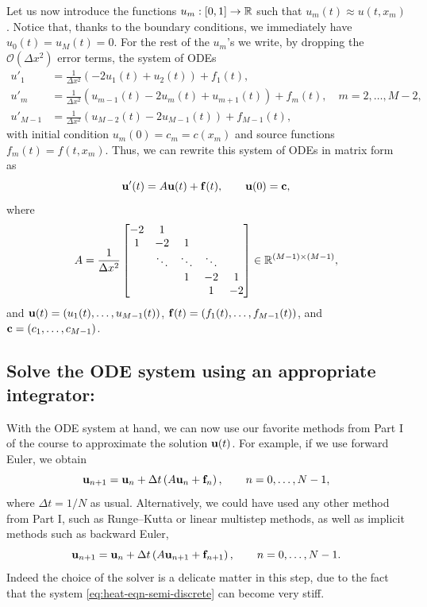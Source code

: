 Let us now introduce the functions $u_m: [0,1] \to \mathbb{R}$ such that 
$u_m(t) \approx u(t, x_m)$. Notice that, thanks to the boundary 
conditions, we immediately have $u_0(t) = u_M(t) = 0$. 
For the rest of the $u_m$'s we write, by dropping the $\mathcal{O}(\Delta x^2)$ 
error terms, the system of ODEs 
\begin{equation*}
    \begin{aligned}
            u'_1 &= \frac{1}{\Delta x^2} (-2 u_1(t) + u_2(t) ) + f_1(t), \\ 
            u'_m &= \frac{1}{\Delta x^2} (u_{m-1}(t) - 2 u_m(t) + u_{m+1}(t)) + f_m(t), \quad 
            m = 2,\dots, M-2, \\ 
            u'_{M-1}& = \frac{1}{\Delta x^2} (u_{M-2}(t) - 2 u_{M-1}(t) ) + f_{M-1}(t),
    \end{aligned}
\end{equation*}
with initial condition $u_m(0) = c_m = c(x_m)$ and source functions $f_m(t) = f(t, x_m)$. Thus, we can rewrite this 
system of ODEs in matrix form as 
\begin{equation}\label{eq:heat-eqn-semi-discrete}
    \mathbf{u}'(t) = A \mathbf{u}(t) + \mathbf{f}(t), \qquad \mathbf{u}(0) = \mathbf{c},
\end{equation}
where 
\begin{equation*}
    A = \frac{1}{\Delta x^2}
    \begin{bmatrix}
        -2 & 1 & & & \\
        1 & -2 & 1 & & \\
        & \ddots & \ddots & \ddots & \\
        & & 1 & -2 & 1 \\
        & & & 1 & -2
    \end{bmatrix} \in \mathbb{R}^{(M-1) \times (M-1)},
\end{equation*}
and $\mathbf{u}(t) = (u_1(t), \dots, u_{M-1}(t))$,
$\mathbf{f}(t) = (f_1(t), \dots, f_{M-1}(t))$,
and $\mathbf{c} = (c_1, \dots, c_{M-1})$.

\subsection*{Solve the ODE system using an appropriate integrator:}
With the ODE system at hand, we can now use our favorite methods from Part I of the course 
to approximate the solution $\mathbf{u}(t)$. For example, if we use forward Euler, we obtain 
\begin{equation*}
    \mathbf{u}_{n+1} = \mathbf{u}_n + \Delta t \left( A \mathbf{u}_n + \mathbf{f}_n \right), \qquad n = 0, \dots, N-1, 
\end{equation*}
where $\Delta t = 1/N$ as usual.  
Alternatively, we could have used any other method 
from Part I, such as Runge--Kutta or linear multistep methods, as well as implicit methods such as 
backward Euler, 
\begin{equation*}
    \mathbf{u}_{n+1} = \mathbf{u}_n + \Delta t \left( A \mathbf{u}_{n+1} + \mathbf{f}_{n+1} \right), \qquad n = 0, \dots, N-1.
\end{equation*}
Indeed the choice of the solver is a delicate matter in this step, due to the fact that 
the system \eqref{eq:heat-eqn-semi-discrete} can become very stiff. 

